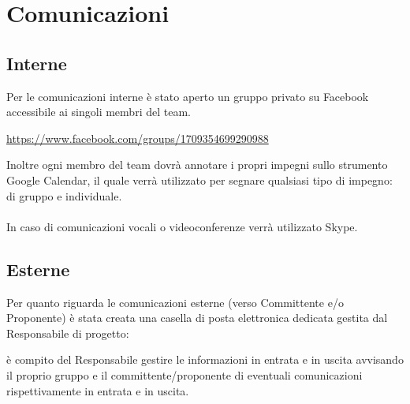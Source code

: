 \section{Comunicazioni}{
	\subsection{Interne}{
		Per le comunicazioni interne \`{e} stato aperto un gruppo privato su Facebook accessibile ai singoli membri del team. \begin{center}
			\url{https://www.facebook.com/groups/1709354699290988}
		\end{center} 
		Inoltre ogni membro del team dovr\`{a} annotare i propri impegni sullo strumento Google Calendar, il quale verr\`{a} utilizzato per segnare qualsiasi tipo di impegno: di gruppo e individuale.\\\\
		In caso di comunicazioni vocali o videoconferenze verrà utilizzato Skype.
		
	 }
	\subsection{Esterne}{
	Per quanto riguarda le comunicazioni esterne (verso Committente e/o Proponente) \`{e} stata creata una casella di posta elettronica dedicata gestita dal Responsabile di progetto: \begin{center}
		\href{mailto:\mail}{\mail} \end{center} \`{e} compito del Responsabile gestire le informazioni in entrata e in uscita avvisando il proprio gruppo e il committente/proponente di eventuali comunicazioni rispettivamente in entrata e in uscita.
		}
}